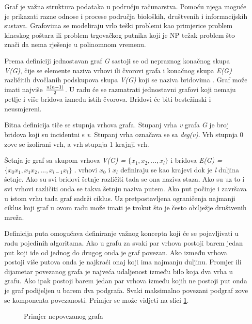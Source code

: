 Graf je važna struktura podataka u području računarstva. Pomoću njega moguće je prikazati razne odnose i procese područja bioloških, društvenih i informacijskih sustava. Grafovima se modeliraju vrlo teški problemi kao primjerice problem kineskog poštara ili problem trgovačkog putnika koji je NP težak problem što znači da nema rješenje u polinomnom vremenu.

Prema definiciji jednostavan graf \textit{G} sastoji se od nepraznog konačnog skupa \textit{V(G)}, čije se elemente naziva vrhovi ili čvorovi grafa i konačnog skupa \textit{E(G)} različitih dvočlanih podskupova skupa \textit{V(G)} koji se naziva bridovima \cite{nakic_pavcevic_2019}. Graf može imati najviše $ {n(n-1) \over 2} $. U radu će se razmatrati jednostavni grafovi koji nemaju petlje i više bridova između istih čvorova. Bridovi će biti bestežinski i neusmjereni. 

Bitna definicija tiče se stupnja vrhova grafa. Stupanj vrha \textit{v} grafa \textit{G} je broj bridova koji su incidentni s \textit{v}. Stupanj vrha označava se sa \textit{deg(v)}. Vrh stupnja 0 zove se izolirani vrh, a vrh stupnja 1 krajnji vrh. \cite{nakic_pavcevic_2019}

Šetnja je graf sa skupom vrhova \textit{V(G) = $ \{x_{1},x_{2},...,x_{l}\} $ } i bridova \textit{E(G) = $ \{x_{0}x_{1},x_{1}x_{2},...,x_{l-1}x_{l}\} $ }. vrhovi $ x_{0} $ i $ x_{l} $ definiraju se kao krajevi dok je \textit{l} duljina šetnje. Ako su svi bridovi šetnje različiti tada se ona naziva staza. Ako su uz to i svi vrhovi različiti onda se takva šetnju naziva putem. Ako put počinje i završava u istom vrhu tada graf sadrži ciklus. Uz pretpostavljena ograničenja najmanji ciklus koji graf u ovom radu može imati je trokut što je često obilježje društvenih mreža.

Definicija puta omogućava definiranje važnog koncepta koji će se pojavljivati u radu pojedinih algoritama. Ako u grafu za svaki par vrhova postoji barem jedan put koji ide od jednog do drugog onda je graf povezan. Ako između vrhova postoji više putova onda je najkraći onaj koji ima najmanju duljinu. Promjer ili dijametar povezanog grafa je najveća udaljenost između bilo koja dva vrha u grafu. Ako ipak postoji barem jedan par vrhova između kojih ne postoji put onda je graf podijeljen u barem dva podgrafa. Svaki maksimalno povezani podgraf zove se komponenta povezanosti. Primjer se može vidjeti na slici \ref{fig:graph}.

\begin{figure}
	\caption{Primjer nepovezanog grafa}
	\label{fig:graph}
\end{figure}

